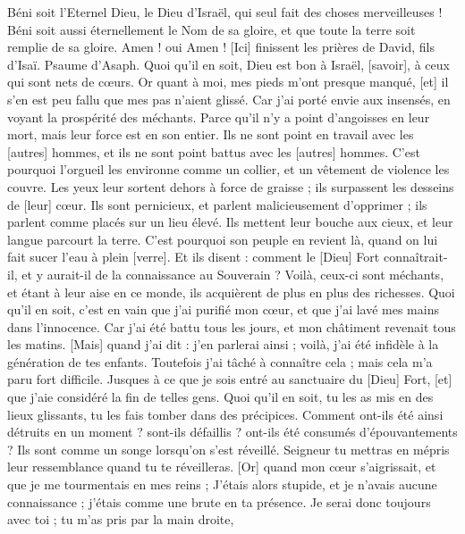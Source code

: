 \begin{multicols}{2}
Béni soit l'Eternel Dieu, le Dieu d'Israël, qui seul fait des choses merveilleuses !
Béni soit aussi éternellement le Nom de sa gloire, et que toute la terre soit remplie de sa gloire. Amen ! oui Amen !
[Ici] finissent les prières de David, fils d'Isaï.
\VerseOne{}Psaume d'Asaph. Quoi qu'il en soit, Dieu est bon à Israël, [savoir], à ceux qui sont nets de cœurs.
Or quant à moi, mes pieds m'ont presque manqué, [et] il s'en est peu fallu que mes pas n'aient glissé.
Car j'ai porté envie aux insensés, en voyant la prospérité des méchants.
Parce qu'il n'y a point d'angoisses en leur mort, mais leur force est en son entier.
Ils ne sont point en travail avec les [autres] hommes, et ils ne sont point battus avec les [autres] hommes.
C'est pourquoi l'orgueil les environne comme un collier, et un vêtement de violence les couvre.
Les yeux leur sortent dehors à force de graisse ; ils surpassent les desseins de [leur] cœur.
Ils sont pernicieux, et parlent malicieusement d'opprimer ; ils parlent comme placés sur un lieu élevé.
Ils mettent leur bouche aux cieux, et leur langue parcourt la terre.
C'est pourquoi son peuple en revient là, quand on lui fait sucer l'eau à plein [verre].
Et ils disent : comment le [Dieu] Fort connaîtrait-il, et y aurait-il de la connaissance au Souverain ?
Voilà, ceux-ci sont méchants, et étant à leur aise en ce monde, ils acquièrent de plus en plus des richesses.
Quoi qu'il en soit, c'est en vain que j'ai purifié mon cœur, et que j'ai lavé mes mains dans l'innocence.
Car j'ai été battu tous les jours, et mon châtiment revenait tous les matins.
[Mais] quand j'ai dit : j'en parlerai ainsi ; voilà, j'ai été infidèle à la génération de tes enfants.
Toutefois j'ai tâché à connaître cela ; mais cela m'a paru fort difficile.
Jusques à ce que je sois entré au sanctuaire du [Dieu] Fort, [et] que j'aie considéré la fin de telles gens.
Quoi qu'il en soit, tu les as mis en des lieux glissants, tu les fais tomber dans des précipices.
Comment ont-ils été ainsi détruits en un moment ? sont-ils défaillis ? ont-ils été consumés d'épouvantements ?
Ils sont comme un songe lorsqu'on s'est réveillé. Seigneur tu mettras en mépris leur ressemblance quand tu te réveilleras.
[Or] quand mon cœur s'aigrissait, et que je me tourmentais en mes reins ;
J'étais alors stupide, et je n'avais aucune connaissance ; j'étais comme une brute en ta présence.
Je serai donc toujours avec toi ; tu m'as pris par la main droite,

\end{multicols}
